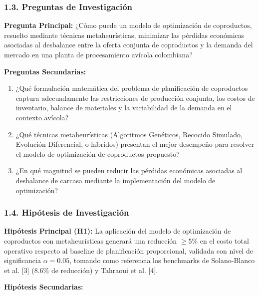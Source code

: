 \documentclass[
  spanish,
  12pt,
]{article}
\begin{document}
\subsubsection{1.3. Preguntas de
Investigación}\label{preguntas-de-investigaciuxf3n}

\textbf{Pregunta Principal:} ¿Cómo puede un modelo de optimización de
coproductos, resuelto mediante técnicas metaheurísticas, minimizar las
pérdidas económicas asociadas al desbalance entre la oferta conjunta de
coproductos y la demanda del mercado en una planta de procesamiento
avícola colombiana?

\textbf{Preguntas Secundarias:}

\begin{enumerate}
\def\labelenumi{\arabic{enumi}.}
\item
  ¿Qué formulación matemática del problema de planificación de
  coproductos captura adecuadamente las restricciones de producción
  conjunta, los costos de inventario, balance de materiales y la
  variabilidad de la demanda en el contexto avícola?
\item
  ¿Qué técnicas metaheurísticas (Algoritmos Genéticos, Recocido
  Simulado, Evolución Diferencial, o híbridos) presentan el mejor
  desempeño para resolver el modelo de optimización de coproductos
  propuesto?
\item
  ¿En qué magnitud se pueden reducir las pérdidas económicas asociadas
  al desbalance de carcasa mediante la implementación del modelo de
  optimización?
\end{enumerate}

\subsubsection{1.4. Hipótesis de
Investigación}\label{hipuxf3tesis-de-investigaciuxf3n}

\textbf{Hipótesis Principal (H1):} La aplicación del modelo de
optimización de coproductos con metaheurísticas generará una reducción
\textbf{\(\geq 5\%\)} en el costo total operativo respecto al baseline
de planificación proporcional, validada con nivel de significancia
\(\alpha=0.05\), tomando como referencia los benchmarks de Solano-Blanco
et al. {[}3{]} (8.6\% de reducción) y Tahraoui et al. {[}4{]}.

\textbf{Hipótesis Secundarias:}
\end{document}
